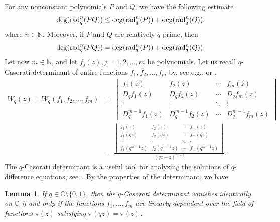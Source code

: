 \documentclass[a4paper,12pt]{article}
\newcommand{\C}{\mathbb{C}}
\newtheorem{lemma}[defin]{Lemma}
\numberwithin{equation}{section}
\begin{document}
For any nonconstant polynomials $P$ and $Q$, we have the following estimate
\begin{equation}\label{degrad}
    \deg ({\rm rad}_q^n(PQ) ) \le \deg ({\rm rad}_q^n(P) )+\deg ({\rm rad}_q^n(Q) ),
\end{equation}
where $n \in \mathbb{N}$. Moreover, if $P$ and $Q$ are relatively $q$-prime, then
    $$
     \deg ({\rm rad}_q^n(PQ) ) = \deg ({\rm rad}_q^n(P) )+\deg ({\rm rad}_q^n(Q) ).
    $$
Let now $m \in \mathbb{N}$, and let $f_j(z), j=1,2,...,m$ be polynomials. Let us recall $q$-Casorati determinant of entire functions $f_1,f_2,...,f_m$ by, see e.g., \cite[Pages 4282-4283]{HKT2014} or \cite{AAIM},
\begin{equation}\label{def.q-Wronskain}
\begin{split}
    W_q(z)=W_q(f_1,f_2,...,f_m)&=
    \begin{vmatrix}
    f_1(z) & f_2(z) & \cdots & f_m(z)\\
    D_qf_1(z) & D_qf_2(z) & \cdots &D_qf_m(z) \\
    \vdots & \vdots & \ddots & \vdots \\
    D_q^{m-1}f_1(z) & D_q^{m-1}f_2(z) & \cdots &D_q^{m-1}f_m(z)
    \end{vmatrix}\\[7pt]
    &= \frac{
    \begin{vmatrix}
    f_1(z) & f_2(z) & \cdots & f_m(z)\\
    f_1(qz) & f_2(qz) & \cdots & f_m(qz) \\
    \vdots & \vdots & \ddots & \vdots \\
    f_1(q^{m-1}z) & f_2(q^{m-1}z) & \cdots &f_m(q^{m-1}z)
    \end{vmatrix}}{(qz-z)^{m-1}}.
\end{split}
\end{equation}
The $q$-Casorati determinant is a useful tool for analyzing the solutions of $q$-difference equations, see~\cite{Wen2014}. By the properties of the determinant, we have
\begin{lemma}\label{lm.q-Wronskain}
If $q\in\C\setminus\{0,1\}$, then the $q$-Casorati determinant vanishes identically on $\C$ if and only if the functions $f_1,\ldots,f_m$ are linearly dependent over the field of functions
$\pi(z)$ satisfying $\pi(qz)=\pi(z)$.
\end{lemma}
\end{document}
